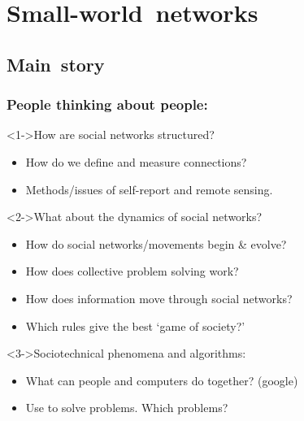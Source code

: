 \section{Small-world\ networks}

\subsection{Main\ story}

\begin{frame}
  \small
  \frametitle{People thinking about people:}
  
  \begin{block}<1->{How are social networks structured?}
    \begin{itemize}
    \item<1-> How do we define and measure connections?
    \item<1-> Methods/issues of self-report and remote sensing.
    \end{itemize}
  \end{block}

  \begin{block}<2->{What about the dynamics of social networks?}
    \begin{itemize}
    \item<2-> How do social networks/movements begin \& evolve? 
    \item<2-> How does collective problem solving work? 
    \item<2-> How does information move through social networks?
    \item<2-> Which rules give the best `game of society?'
    \end{itemize}
  \end{block}

  \begin{block}<3->{Sociotechnical phenomena and algorithms:}
    \begin{itemize}
    \item<3->
      What can people and computers do together? (google)
    \item<3->
      Use  to solve problems.  Which problems?
    \end{itemize}
  \end{block}

\end{frame}

